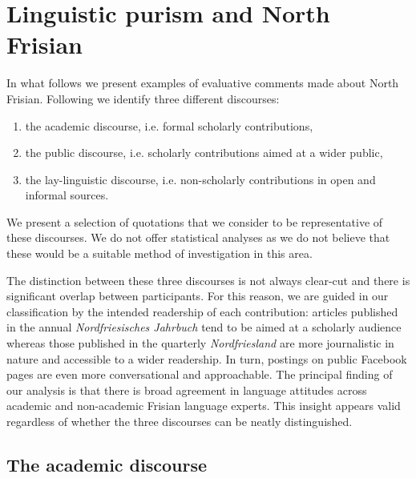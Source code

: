 \documentclass[output=paper]{langsci/langscibook}
\begin{document}
\section{Linguistic purism and North Frisian}
\label{sec:gregersen:5}

In what follows we present examples of evaluative comments made about North Frisian. Following \citet{Gregersen2019} we identify three different discourses: 

\begin{enumerate}
\item  the academic discourse, i.e. formal scholarly contributions,
\item  the public discourse, i.e. scholarly contributions aimed at a wider public,
\item the lay-linguistic discourse, i.e. non-scholarly contributions in open and informal sources.
\end{enumerate}

We present a selection of quotations that we consider to be representative of these discourses. We do not offer statistical analyses as we do not believe that these would be a suitable method of investigation in this area. 

The distinction between these three discourses is not always clear-cut and there is significant overlap between participants. For this reason, we are guided in our classification by the intended readership of each contribution: articles published in the annual \textit{Nordfriesisches Jahrbuch} tend to be aimed at a scholarly audience whereas those published in the quarterly \textit{Nordfriesland} are more journalistic in nature and accessible to a wider readership. In turn, postings on public Facebook pages are even more conversational and approachable. The principal finding of our analysis is that there is broad agreement in language attitudes across academic and non-academic Frisian language experts. This insight appears valid regardless of whether the three discourses can be neatly distinguished.

\subsection{The academic discourse}
\label{sec:gregersen:5.1}
\end{document}
